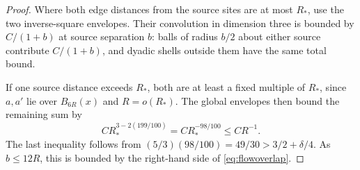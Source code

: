 \begin{proof}
Where both edge distances from the source sites are at most $R_*$,
use the two inverse-square envelopes.  Their convolution in dimension
three is bounded by $C/(1+b)$ at source separation $b$: balls of
radius $b/2$ about either source contribute $C/(1+b)$, and dyadic
shells outside them have the same total bound.

If one source distance exceeds $R_*$, both are at least a fixed
multiple of $R_*$, since $a,a'$ lie over $B_{6R}(x)$ and $R=o(R_*)$.
The global envelopes then bound the remaining sum by
\[
 C R_*^{3-2(199/100)}
       =C R_*^{-98/100}
       \le C R^{-1}.
\]
The last inequality follows from
$(5/3)(98/100)=49/30>3/2+\delta/4$.
As $b\le12R$, this is bounded by the right-hand side of
\eqref{eq:flowoverlap}.
\end{proof}
